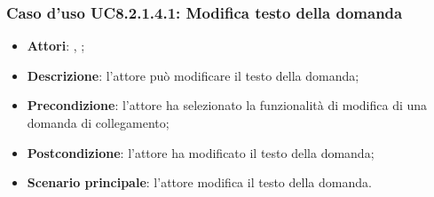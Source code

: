 	\subsubsection{Caso d'uso UC8.2.1.4.1: Modifica testo della domanda}
	\label{UC8.2.1.4.1}
	\begin{itemize}
		\item
		\textbf{Attori}: \uau, \uaupro;
		\item		
		\textbf{Descrizione}: l'attore può modificare il testo della domanda;
		\item
		\textbf{Precondizione}: l'attore ha selezionato la funzionalità di modifica di una domanda di collegamento; 
		\item
		\textbf{Postcondizione}: l'attore ha modificato il testo della domanda;
		\item
		\textbf{Scenario principale}: l'attore modifica il testo della domanda.	
	\end{itemize}

